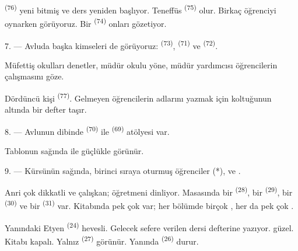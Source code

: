  \textsuperscript{(76)} yeni bitmiş ve ders yeniden
başlıyor. Teneffüs  \textsuperscript{(75)} olur. Birkaç öğrenciyi
oynarken görüyoruz. Bir  \textsuperscript{(74)} onları
gözetiyor.

7. --- Avluda başka kimseleri de görüyoruz: 
\textsuperscript{(73)},  \textsuperscript{(71)} ve  \textsuperscript{(72)}.

Müfettiş okulları denetler, müdür okulu yöne, müdür yardımcısı öğrencilerin
çalışmasını göze.

Dördüncü kişi  \textsuperscript{(77)}. Gelmeyen öğrencilerin
adlarını yazmak için koltuğunun altında bir defter taşır.

8. --- Avlunun dibinde  \textsuperscript{(70)} ile
 \textsuperscript{(69)} atölyesi var.

Tablonun sağında  ile   güçlükle
görünür.


\VUsaut{2.4mm}

\VUsaut{3.0mm}

9. --- Kürsünün sağında, birinci sıraya oturmuş öğrenciler  (*),
 ve .

Anri çok dikkatli ve çalışkan; öğretmeni dinliyor. Masasında bir
 \textsuperscript{(28)}, bir 
\textsuperscript{(29)}, bir  \textsuperscript{(30)} ve bir
 \textsuperscript{(31)} var. Kitabında pek çok
 var; her bölümde birçok , her
 da pek çok .

Yanındaki Etyen \textsuperscript{(24)} hevesli. Gelecek sefere verilen dersi
defterine yazıyor.  güzel. Kitabı kapalı. Yalnız
 \textsuperscript{(27)} görünür. Yanında 
\textsuperscript{(26)} durur.

